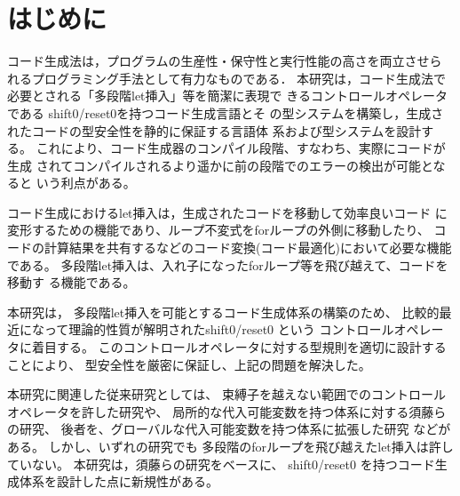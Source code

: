 
\section{はじめに}
コード生成法は，プログラムの生産性・保守性と実行性能の高さを両立させら
れるプログラミング手法として有力なものである．
本研究は，コード生成法で必要とされる「多段階let挿入」等を簡潔に表現で
きるコントロールオペレータである shift0/reset0を持つコード生成言語とそ
の型システムを構築し，生成されたコードの型安全性を静的に保証する言語体
系および型システムを設計する。
これにより、コード生成器のコンパイル段階、すなわち、実際にコードが生成
されてコンパイルされるより遥かに前の段階でのエラーの検出が可能となると
いう利点がある。

コード生成におけるlet挿入は，生成されたコードを移動して効率良いコード
に変形するための機能であり、ループ不変式をforループの外側に移動したり、
コードの計算結果を共有するなどのコード変換(コード最適化)において必要な機能である。
多段階let挿入は、入れ子になったforループ等を飛び越えて、コードを移動す
る機能である。



本研究は，
多段階let挿入を可能とするコード生成体系の構築のため、
比較的最近になって理論的性質が解明されたshift0/reset0 という
コントロールオペレータに着目する。
このコントロールオペレータに対する型規則を適切に設計することにより、
型安全性を厳密に保証し、上記の問題を解決した。

本研究に関連した従来研究としては、
束縛子を越えない範囲でのコントロールオペレータを許した研究や、
局所的な代入可能変数を持つ体系に対する須藤らの研究\cite{Sudo2014}、
後者を、グローバルな代入可能変数を持つ体系に拡張した研究
\cite{Aplas2016}などがある。
しかし、いずれの研究でも 多段階のforループを飛び越えたlet挿入は許していない。
本研究は，須藤らの研究をベースに、
shift0/reset0 を持つコード生成体系を設計した点に新規性がある。

